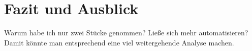 \chapter{Fazit und Ausblick}
\label{chap:Fazit und Ausblick}



Warum habe ich nur zwei Stücke genommen? Ließe sich mehr automatisieren? Damit könnte man entsprechend eine viel weitergehende Analyse machen.
